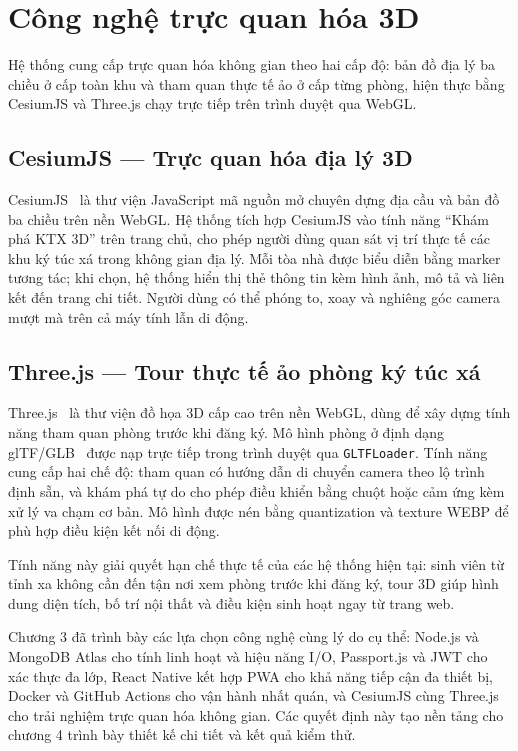 \documentclass[../DoAn.tex]{subfiles}
\begin{document}
\section{Công nghệ trực quan hóa 3D}
\label{sec:visualization}

Hệ thống cung cấp trực quan hóa không gian theo hai cấp độ: bản đồ địa lý ba
chiều ở cấp toàn khu và tham quan thực tế ảo ở cấp từng phòng, hiện thực bằng
CesiumJS và Three.js chạy trực tiếp trên trình duyệt qua WebGL.

\subsection{CesiumJS --- Trực quan hóa địa lý 3D}
\label{subsec:cesium}

CesiumJS~\cite{cesiumjs} là thư viện JavaScript mã nguồn mở chuyên dựng địa
cầu và bản đồ ba chiều trên nền WebGL. Hệ thống tích hợp CesiumJS vào tính
năng ``Khám phá KTX 3D'' trên trang chủ, cho phép người dùng quan sát vị trí
thực tế các khu ký túc xá trong không gian địa lý. Mỗi tòa nhà được biểu diễn
bằng marker tương tác; khi chọn, hệ thống hiển thị thẻ thông tin kèm hình ảnh,
mô tả và liên kết đến trang chi tiết. Người dùng có thể phóng to, xoay và
nghiêng góc camera mượt mà trên cả máy tính lẫn di động.

\subsection{Three.js --- Tour thực tế ảo phòng ký túc xá}
\label{subsec:threejs}

Three.js~\cite{threejs} là thư viện đồ họa 3D cấp cao trên nền WebGL, dùng để
xây dựng tính năng tham quan phòng trước khi đăng ký. Mô hình phòng ở định
dạng glTF/GLB~\cite{khronos_gltf} được nạp trực tiếp trong trình duyệt qua
\texttt{GLTFLoader}. Tính năng cung cấp hai chế độ: tham quan có hướng dẫn
di chuyển camera theo lộ trình định sẵn, và khám phá tự do cho phép điều khiển
bằng chuột hoặc cảm ứng kèm xử lý va chạm cơ bản. Mô hình được nén bằng
quantization và texture WEBP để phù hợp điều kiện kết nối di động.

Tính năng này giải quyết hạn chế thực tế của các hệ thống hiện tại: sinh viên
từ tỉnh xa không cần đến tận nơi xem phòng trước khi đăng ký, tour 3D giúp
hình dung diện tích, bố trí nội thất và điều kiện sinh hoạt ngay từ trang web.

Chương 3 đã trình bày các lựa chọn công nghệ cùng lý do cụ thể: Node.js và
MongoDB Atlas cho tính linh hoạt và hiệu năng I/O, Passport.js và JWT cho xác
thực đa lớp, React Native kết hợp PWA cho khả năng tiếp cận đa thiết bị,
Docker và GitHub Actions cho vận hành nhất quán, và CesiumJS cùng Three.js cho
trải nghiệm trực quan hóa không gian. Các quyết định này tạo nền tảng cho
chương 4 trình bày thiết kế chi tiết và kết quả kiểm thử.
\end{document}

